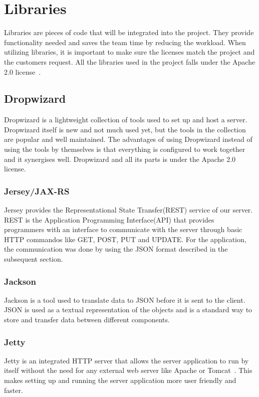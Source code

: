 \section{Libraries}
Libraries are pieces of code that will be integrated into the project. They provide functionality needed and saves the team time by reducing the workload. 
When utilizing libraries, it is important to make sure the licenses match the project and the customers request. All the libraries used in the project falls under the Apache 2.0 license~\cite{Apache}.

\subsection{Dropwizard}
Dropwizard is a lightweight collection of tools used to set up and host a server. Dropwizard itself is new and not much used yet, but the tools in the collection are popular and well maintained. 
The advantages of using Dropwizard instead of using the tools by themselves is that everything is configured to work together and it synergises well.
Dropwizard and all its parts is under the Apache 2.0 license. 

\subsubsection{Jersey/JAX-RS}
Jersey provides the Representational State Transfer(REST) service of our server. REST is the Application Programming Interface(API) that provides programmers with an 
interface to communicate with the server through basic HTTP commandos like GET, POST, PUT and UPDATE. For the application, the communication was done by using the JSON format 
described in the subsequent section.

\subsubsection{Jackson}
Jackson is a tool used to translate data to JSON before it is sent to the client. JSON is used as a textual representation of the objects and is a standard way to store 
and transfer data between different components.

\subsubsection{Jetty}
Jetty is an integrated HTTP server that allows the server application to run by itself without the need for any external web server like Apache or Tomcat~\cite{tomcat}. 
This makes setting up and running the server application more user friendly and faster.


